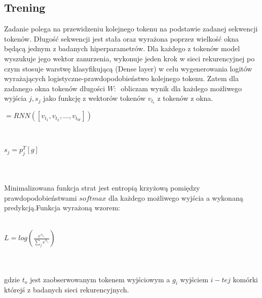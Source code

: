\subsection{Trening}
Zadanie polega na przewidzeniu kolejnego tokenu na podstawie zadanej sekwencji tokenów. Długość sekwencji jest stała oraz wyrażona poprzez wielkość okna będącą jednym z badanych hiperparametrów. 
Dla każdego z tokenów model wyszukuje jego wektor zanurzenia, wykonuje jeden krok w sieci rekurencyjnej po czym stosuje warstwę klasyfikującą 
(Dense layer) w celu wygenerowania logitów wyrażających logistyczne-prawdopodobieństwo kolejnego tokenu. Zatem dla zadanego okna tokenów długości \begin{math}W\end{math}:
\begin{math}[t_1, t_2, ... t_W]\end{math} obliczam wynik dla każdego możliwego wyjścia \begin{math}j, s_j\end{math} jako funkcję z wektorów tokenów \begin{math}v_{t_i}\end{math}
z tokenów z okna.
\\
\centerline{\begin{math}[g_1, g_2, ..., g_W] = RNN([v_{t_1}, v_{t_2}, ..., v_{t_W}])\end{math}}\\
\centerline{\begin{math}s_j=p_{j}^{T}[g]\end{math}} \\\\
Minimalizowana funkcja strat jest entropią krzyżową pomiędzy prawdopodobieństwami \begin{math}softmax\end{math} dla każdego możliwego wyjścia 
a wykonaną predykcją.Funkcja wyrażoną wzorem: \\\\
\centerline{\begin{math}L = log(\frac{e^{s_{t_o}}}{\sum_{j}e^{s_{t_j}}})\end{math}}\\\\
gdzie \begin{math}t_o\end{math} jest zaobserwowanym tokenem wyjściowym a \begin{math}g_i\end{math} wyjściem \begin{math}i-tej\end{math} komórki
którejś z badanych sieci rekurencyjnych. 


